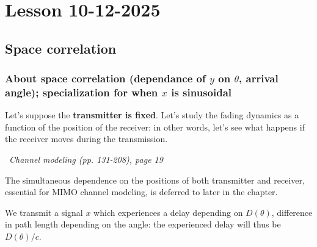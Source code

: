 \documentclass[a4paper, 12pt]{book}
\begin{document}
\setcounter{chapter}{11}
\chapter{Lesson 10-12-2025}
\section{Space correlation}

\subsection{About space correlation (dependance of \texorpdfstring{$y$}{y} on \texorpdfstring{$\theta$}{θ}, arrival angle); specialization for when \texorpdfstring{$x$}{x} is sinusoidal}

Let's suppose the \textbf{transmitter is fixed}. Let's study the fading dynamics as a function of the position of the receiver: in other words, let's see what happens if the receiver moves during the transmission.

\begin{yellowbox}
\faBook\ \textit{Channel modeling (pp. 131-208), page 19}

The simultaneous dependence on the positions of both transmitter and receiver, essential for MIMO channel modeling, is deferred to later in the chapter.
\end{yellowbox}

We transmit a signal $x$ which experiences a delay depending on $D(\theta)$, difference in path length depending on the angle: the experienced delay will thus be $D(\theta)/c$.

\begin{center}
\end{center}
\end{document}
